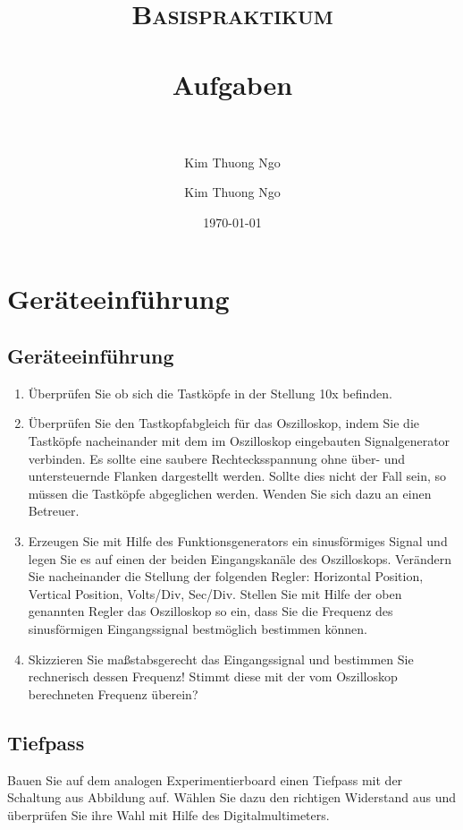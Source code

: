 \documentclass[paper=a4, fontsize=11pt]{scrartcl}
\author{Kim Thuong Ngo}
\title{	
\normalfont \normalsize 
\textsc{Basispraktikum} \\ [25pt] 
\horrule{0.5pt} \\[0.4cm] 
\huge Aufgaben \\ 
\horrule{2pt} \\[0.5cm] 
}
\author{Kim Thuong Ngo}
\date{\normalsize\today}
\numberwithin{equation}{section}
\numberwithin{figure}{section}
\numberwithin{table}{section}
\begin{document}
\maketitle 

\newpage

\tableofcontents

\newpage


\section{Geräteeinführung}

\subsection{Geräteeinführung}

\begin{enumerate}
\item Überprüfen Sie ob sich die Tastköpfe in der Stellung 10x befinden.
\item Überprüfen Sie den Tastkopfabgleich für das Oszilloskop, indem Sie die Tastköpfe nacheinander mit dem im Oszilloskop eingebauten Signalgenerator verbinden. Es sollte eine saubere Rechtecksspannung ohne über- und untersteuernde Flanken dargestellt werden. Sollte dies nicht der Fall sein, so müssen die Tastköpfe abgeglichen werden. Wenden Sie sich dazu an einen Betreuer.
\item Erzeugen Sie mit Hilfe des Funktionsgenerators ein sinusförmiges Signal und legen Sie es auf einen der beiden Eingangskanäle des Oszilloskops. Verändern Sie nacheinander die Stellung der folgenden Regler: Horizontal Position, Vertical Position, Volts/Div, Sec/Div. Stellen Sie mit Hilfe der oben genannten Regler das Oszilloskop so ein, dass Sie die Frequenz des sinusförmigen Eingangssignal bestmöglich bestimmen können.
\item Skizzieren Sie maßstabsgerecht das Eingangssignal und bestimmen Sie rechnerisch dessen Frequenz! Stimmt diese mit der vom Oszilloskop berechneten Frequenz überein?
\end{enumerate}

\subsection{Tiefpass}

Bauen Sie auf dem analogen Experimentierboard einen Tiefpass mit der Schaltung aus Abbildung auf. Wählen Sie dazu den richtigen Widerstand aus und überprüfen Sie ihre Wahl mit Hilfe des Digitalmultimeters. \\
\end{document}
